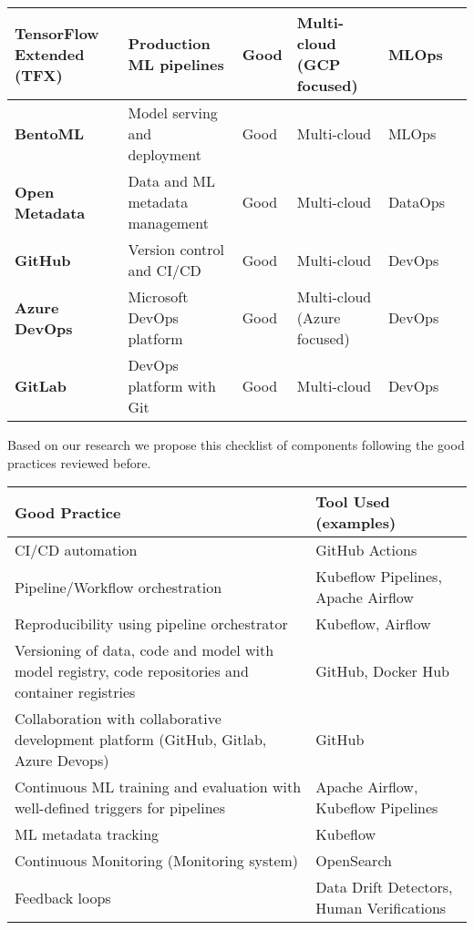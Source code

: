 \begin{longtable}{|p{2cm}|p{3.5cm}|p{2cm}|p{2cm}|p{1.5cm}|p{1.5cm}|}
    \textbf{TensorFlow Extended (TFX)} & Production ML pipelines & Good & Multi-cloud (GCP focused) & MLOps & \cite{Kreuzberger2022MachineLO} \\
    \hline

    \textbf{BentoML} & Model serving and deployment & Good & Multi-cloud & MLOps & \cite{9792270,BURGUENOROMERO2025107499,mlops-definition-tools-and-challenge} \\
    \hline

    \textbf{Open Metadata} & Data and ML metadata management & Good & Multi-cloud & DataOps & \cite{} \\
    \hline

    \textbf{GitHub} & Version control and CI/CD & Good & Multi-cloud & DevOps & \cite{} \\
    \hline

    \textbf{Azure DevOps} & Microsoft DevOps platform & Good & Multi-cloud (Azure focused) & DevOps & \cite{Kreuzberger2022MachineLO,gift2021practical} \\
    \hline

    \textbf{GitLab} & DevOps platform with Git & Good & Multi-cloud & DevOps & \cite{9792270} \\
    \hline

\end{longtable}
\normalsize


Based on our research we propose this checklist of components following the good practices reviewed before.
\begin{longtable}{|p{7cm}|p{6cm}|}
    \hline
    \textbf{Good Practice} & \textbf{Tool Used (examples)} \\
    \hline
    CI/CD automation & GitHub Actions\\
    \hline
    Pipeline/Workflow orchestration & Kubeflow Pipelines, Apache Airflow\\
    \hline
    Reproducibility using pipeline orchestrator & Kubeflow, Airflow \\
    \hline
    Versioning of data, code and model with model registry, code repositories and container registries & GitHub, Docker Hub \\
    \hline
    Collaboration with collaborative development platform (GitHub, Gitlab, Azure Devops) & GitHub \\
    \hline
    Continuous ML training and evaluation with well-defined triggers for pipelines & Apache Airflow, Kubeflow Pipelines\\
    \hline
    ML metadata tracking & Kubeflow \\
    \hline
    Continuous Monitoring (Monitoring system) & OpenSearch \\
    \hline
    Feedback loops & Data Drift Detectors, Human Verifications \\
    \hline
\end{longtable}